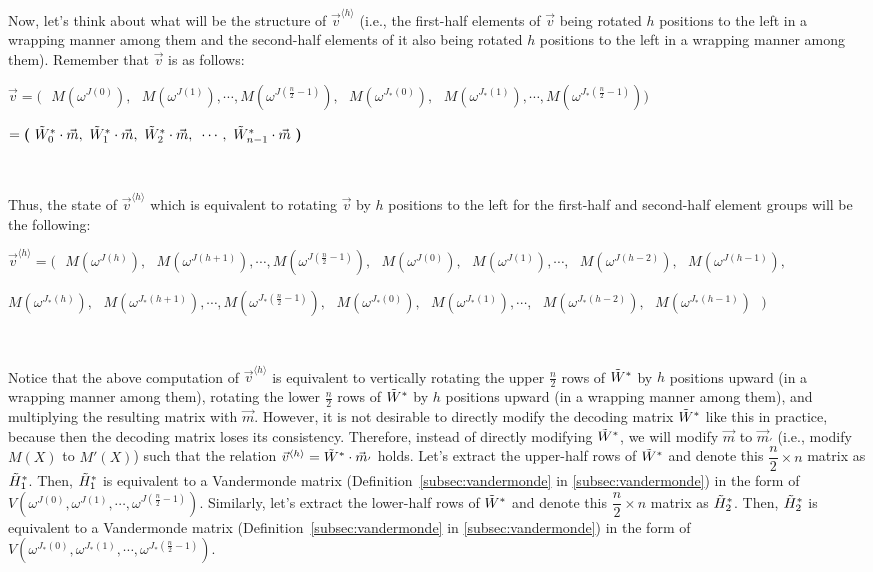 Now, let's think about what will be the structure of $\vec{v}^{\langle h \rangle}$ (i.e., the first-half elements of $\vec{v}$ being rotated $h$ positions to the left in a wrapping manner among them and the second-half elements of it also being rotated $h$ positions to the left in a wrapping manner among them). Remember that $\vec{v}$ is as follows:

$\vec{v} = \bm{(} \text{ } 
M(\omega^{J(0)}), \text{ } M(\omega^{J(1)}), \cdots,  M(\omega^{J(\frac{n}{2}-1)}), \text{ } 
M(\omega^{J_*(0)}), \text{ } M(\omega^{J_*(1)}),  \cdots,  M(\omega^{J_*(\frac{n}{2}-1)}) \bm{)}$


\text{ } \text{ } $= \bm{(} \text{ } \tilde{W}^*_0\cdot \vec{m}, \text{ } \tilde{W}^*_1\cdot \vec{m}, \text{ } \tilde{W}^*_2\cdot \vec{m}, \text{ } \cdots, \text{ } \tilde{W}^*_{n - 1}\cdot \vec{m} \text{ } \bm{)} $ 

$ $

Thus, the state of $\vec{v}^{\langle h \rangle}$ which is equivalent to rotating $\vec{v}$ by $h$ positions to the left for the first-half and second-half element groups will be the following: 

$\vec{v}^{\langle h \rangle} = \bm{(} \text{ } M(\omega^{J(h)}), \text{ } M(\omega^{J(h+1)}), \cdots, M(\omega^{J(\frac{n}{2}-1)}), \text{ } M(\omega^{J(0)}), \text{ }M(\omega^{J(1)}), \cdots, \text{ } M(\omega^{J(h-2)}), \text{ } M(\omega^{J(h-1)}),$

\text{ }\text{ }\text{ } $ M(\omega^{J_*(h)}), \text{ } M(\omega^{J_*(h+1)}), \cdots, M(\omega^{J_*(\frac{n}{2}-1)}), \text{ } M(\omega^{J_*(0)}), \text{ }M(\omega^{J_*(1)}), \cdots, \text{ } M(\omega^{J_*(h-2)}), \text{ } M(\omega^{J_*(h-1)}) \text{ } \bm{)}$

$ $

Notice that the above computation of $\vec{v}^{\langle h \rangle}$ is equivalent to vertically rotating the upper $\frac{n}{2}$ rows of $\tilde{W}^*$ by $h$ positions upward (in a wrapping manner among them), rotating the lower $\frac{n}{2}$ rows of $\tilde{W}^{*}$ by $h$ positions upward (in a wrapping manner among them), and multiplying the resulting matrix with $\vec{m}$. However, it is not desirable to directly modify the decoding matrix $\tilde{W}^*$ like this in practice, because then the decoding matrix loses its consistency. Therefore, instead of directly modifying $\tilde{W}^*$, we will modify $\vec{m}$ to $\vec{m}_{'}$ (i.e., modify $M(X)$ to $M'(X)$) such that the relation $\vec{v}^{\langle h \rangle} = \tilde{W}^* \cdot \vec{m}_{'}$ holds. Let's extract the upper-half rows of $\tilde{W}^*$ and denote this $\dfrac{n}{2} \times n$ matrix as $\tilde{H}_1^*$. Then, $\tilde{H}_1^*$ is equivalent to a Vandermonde matrix (Definition~\ref*{subsec:vandermonde} in \autoref{subsec:vandermonde}) in the form of $V(\omega^{J(0)}, \omega^{J(1)}, \cdots, \omega^{J(\frac{n}{2}-1)})$. Similarly, let's extract the lower-half rows of $\tilde{W}^*$ and denote this $\dfrac{n}{2} \times n$ matrix as $\tilde{H}_2^*$. Then, $\tilde{H}_2^*$ is equivalent to a Vandermonde matrix (Definition~\ref*{subsec:vandermonde} in \autoref{subsec:vandermonde}) in the form of $V(\omega^{J_*(0)}, \omega^{J_*(1)}, \cdots, \omega^{J_*(\frac{n}{2}-1)})$. 

